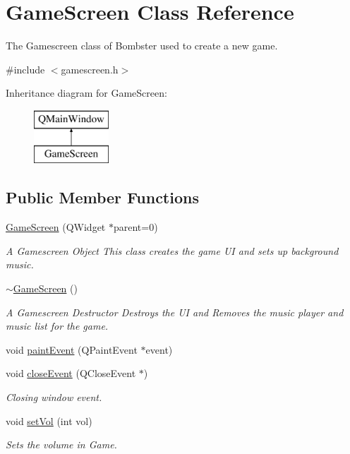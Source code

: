 \hypertarget{class_game_screen}{\section{Game\-Screen Class Reference}
\label{class_game_screen}
}


The Gamescreen class of Bombster used to create a new game.  




{\ttfamily \#include $<$gamescreen.\-h$>$}

Inheritance diagram for Game\-Screen\-:\begin{figure}[H]
\begin{center}
\leavevmode
\includegraphics[height=2.000000cm]{class_game_screen}
\end{center}
\end{figure}
\subsection*{Public Member Functions}
\begin{DoxyCompactItemize}
\item 
\hyperlink{class_game_screen_a61ac084a564d45be53337cc364214a60}{Game\-Screen} (Q\-Widget $\ast$parent=0)
\begin{DoxyCompactList}\small\item\em A Gamescreen Object This class creates the game U\-I and sets up background music. \end{DoxyCompactList}\item 
\hyperlink{class_game_screen_a0d25dfce42d72954aab40dbccbf1a0b1}{$\sim$\-Game\-Screen} ()
\begin{DoxyCompactList}\small\item\em A Gamescreen Destructor Destroys the U\-I and Removes the music player and music list for the game. \end{DoxyCompactList}\item 
void \hyperlink{class_game_screen_ab954f12aa342e80cb55dd4e2b8d3afeb}{paint\-Event} (Q\-Paint\-Event $\ast$event)
\item 
void \hyperlink{class_game_screen_af2a5d4c707d0d0f47201eec498b77bd6}{close\-Event} (Q\-Close\-Event $\ast$)
\begin{DoxyCompactList}\small\item\em Closing window event. \end{DoxyCompactList}\item 
void \hyperlink{class_game_screen_aeb56964e385b3f4b0fb8cdab4b943303}{set\-Vol} (int vol)
\begin{DoxyCompactList}\small\item\em Sets the volume in Game. \end{DoxyCompactList}\end{DoxyCompactItemize}
